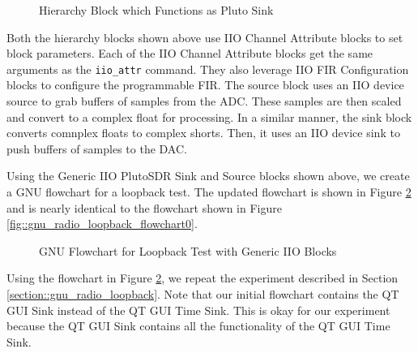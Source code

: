 \documentclass{article}
\begin{document}
\begin{figure}[H]
	\centerline{}
	\caption{Hierarchy Block which Functions as Pluto Sink}
	\label{fig::pluto_iio_device_sink}
\end{figure}

Both the hierarchy blocks shown above use IIO Channel Attribute blocks to set block parameters. Each of the IIO Channel Attribute blocks get the same arguments as the \texttt{iio\_attr} command. They also leverage  IIO FIR Configuration blocks to configure the programmable FIR. The source block uses an IIO device source to grab buffers of samples from the ADC. These samples are then scaled and convert to a complex float for processing. In a similar manner, the sink block converts comnplex floats to complex shorts. Then, it uses an IIO device sink to push buffers of samples to the DAC. 

Using the Generic IIO PlutoSDR Sink and Source blocks shown above, we create a GNU flowchart for a loopback test. The updated flowchart is shown in Figure \ref{fig::gnu_radio_loopback_generic_iio} and is nearly identical to the flowchart shown in Figure \ref{fig::gnu_radio_loopback_flowchart0}.

\begin{figure}[H]
	\centerline{}
	\caption{GNU Flowchart for Loopback Test with Generic IIO Blocks}
	\label{fig::gnu_radio_loopback_generic_iio}
\end{figure}

Using the flowchart in Figure \ref{fig::gnu_radio_loopback_generic_iio}, we repeat the experiment described in Section \ref{section::gnu_radio_loopback}. Note that our initial flowchart contains the QT GUI Sink instead of the QT GUI Time Sink. This is okay for our experiment because the QT GUI Sink contains all the functionality of the QT GUI Time Sink.
\end{document}
